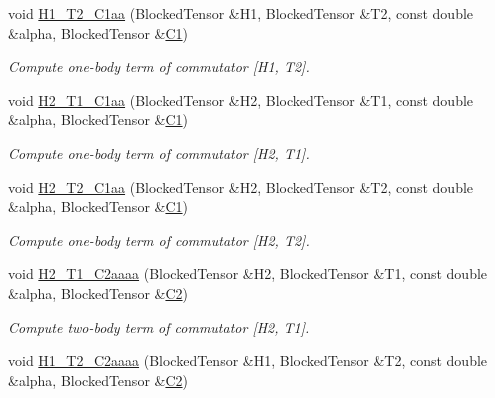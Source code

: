 \begin{DoxyCompactItemize}
void \mbox{\hyperlink{classforte_1_1_d_s_r_g___m_r_p_t2_a2f9f75d569a3f7e0089c5a7e149dfb6f}{H1\+\_\+\+T2\+\_\+\+C1aa}} (Blocked\+Tensor \&H1, Blocked\+Tensor \&T2, const double \&alpha, Blocked\+Tensor \&\mbox{\hyperlink{namespaceforte_abe00ec86d0015c0f2b6ac298c6e428e4a1a2ddc2db4693cfd16d534cde5572cc1}{C1}})
\begin{DoxyCompactList}\small\item\em Compute one-\/body term of commutator \mbox{[}H1, T2\mbox{]}. \end{DoxyCompactList}\item 
void \mbox{\hyperlink{classforte_1_1_d_s_r_g___m_r_p_t2_a5736629d09e1cdbded40bfb525757115}{H2\+\_\+\+T1\+\_\+\+C1aa}} (Blocked\+Tensor \&H2, Blocked\+Tensor \&T1, const double \&alpha, Blocked\+Tensor \&\mbox{\hyperlink{namespaceforte_abe00ec86d0015c0f2b6ac298c6e428e4a1a2ddc2db4693cfd16d534cde5572cc1}{C1}})
\begin{DoxyCompactList}\small\item\em Compute one-\/body term of commutator \mbox{[}H2, T1\mbox{]}. \end{DoxyCompactList}\item 
void \mbox{\hyperlink{classforte_1_1_d_s_r_g___m_r_p_t2_a927350265348432fed3dc13838860b38}{H2\+\_\+\+T2\+\_\+\+C1aa}} (Blocked\+Tensor \&H2, Blocked\+Tensor \&T2, const double \&alpha, Blocked\+Tensor \&\mbox{\hyperlink{namespaceforte_abe00ec86d0015c0f2b6ac298c6e428e4a1a2ddc2db4693cfd16d534cde5572cc1}{C1}})
\begin{DoxyCompactList}\small\item\em Compute one-\/body term of commutator \mbox{[}H2, T2\mbox{]}. \end{DoxyCompactList}\item 
void \mbox{\hyperlink{classforte_1_1_d_s_r_g___m_r_p_t2_aa16510df1c5e35c95718f66934c0e755}{H2\+\_\+\+T1\+\_\+\+C2aaaa}} (Blocked\+Tensor \&H2, Blocked\+Tensor \&T1, const double \&alpha, Blocked\+Tensor \&\mbox{\hyperlink{namespaceforte_abe00ec86d0015c0f2b6ac298c6e428e4af1a543f5a2c5d49bc5dde298fcf716e4}{C2}})
\begin{DoxyCompactList}\small\item\em Compute two-\/body term of commutator \mbox{[}H2, T1\mbox{]}. \end{DoxyCompactList}\item 
void \mbox{\hyperlink{classforte_1_1_d_s_r_g___m_r_p_t2_a09f8f3de3f9160f9c573b8180cf4d78c}{H1\+\_\+\+T2\+\_\+\+C2aaaa}} (Blocked\+Tensor \&H1, Blocked\+Tensor \&T2, const double \&alpha, Blocked\+Tensor \&\mbox{\hyperlink{namespaceforte_abe00ec86d0015c0f2b6ac298c6e428e4af1a543f5a2c5d49bc5dde298fcf716e4}{C2}})

\end{DoxyCompactItemize}
